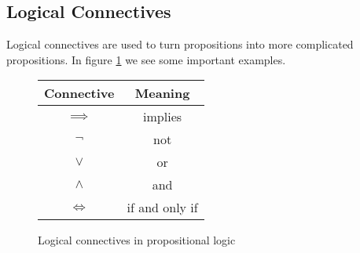 \documentclass[11pt]{article}
\begin{document}
\subsection{Logical Connectives}
Logical connectives are used to turn propositions into more complicated propositions. In figure \ref{fig:propositionalConnectives} we see some important examples.
\begin{figure}[H]
    \caption{Logical connectives in propositional logic}
    \label{fig:propositionalConnectives}
    \centering
    \begin{tabular}{|c|c|}
        \hline
        Connective & Meaning  \\ \hline \hline
        $\implies$ & implies \\ \hline
        $\neg$ & not \\ \hline
        $\lor$ & or \\ \hline  
        $\land$ & and \\ \hline
        $\iff$ & if and only if \\ \hline
    \end{tabular}
\end{figure}
\end{document}
